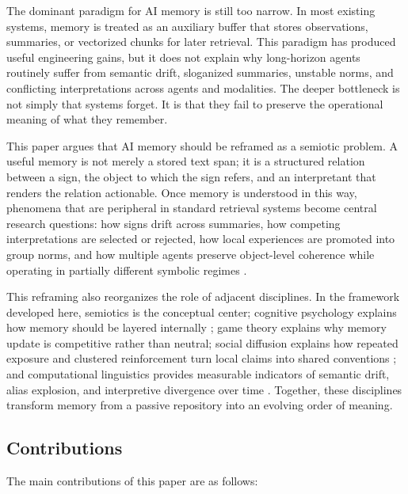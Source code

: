 \documentclass[11pt]{article}
\begin{document}
The dominant paradigm for AI memory is still too narrow. In most existing systems, memory is treated as an auxiliary buffer that stores observations, summaries, or vectorized chunks for later retrieval. This paradigm has produced useful engineering gains, but it does not explain why long-horizon agents routinely suffer from semantic drift, sloganized summaries, unstable norms, and conflicting interpretations across agents and modalities. The deeper bottleneck is not simply that systems forget. It is that they fail to preserve the operational meaning of what they remember.

This paper argues that AI memory should be reframed as a semiotic problem. A useful memory is not merely a stored text span; it is a structured relation between a sign, the object to which the sign refers, and an interpretant that renders the relation actionable. Once memory is understood in this way, phenomena that are peripheral in standard retrieval systems become central research questions: how signs drift across summaries, how competing interpretations are selected or rejected, how local experiences are promoted into group norms, and how multiple agents preserve object-level coherence while operating in partially different symbolic regimes \cite{short2021peirce, lotman2005semiosphere}.

This reframing also reorganizes the role of adjacent disciplines. In the framework developed here, semiotics is the conceptual center; cognitive psychology explains how memory should be layered internally \cite{atkinson1968human, baddeley1974working, tulving1972episodic, nelson1990metamemory}; game theory explains why memory update is competitive rather than neutral; social diffusion explains how repeated exposure and clustered reinforcement turn local claims into shared conventions \cite{centola2010spread}; and computational linguistics provides measurable indicators of semantic drift, alias explosion, and interpretive divergence over time \cite{hamilton2016diachronic}. Together, these disciplines transform memory from a passive repository into an evolving order of meaning.

\subsection{Contributions}

The main contributions of this paper are as follows:
\end{document}
